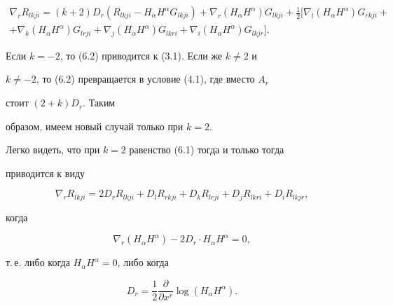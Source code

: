 \begin{multline}


\nabla_r R_{lkji}=(k+2)


D_r(R_{lkji}-H_\alpha H^\alpha G_{lkji})+


\nabla_r(H_\alpha H^\alpha)G_{lkji}+


\tfrac{1}{2}[


\nabla_l(H_\alpha H^\alpha)G_{rkji}+ \\


+ \nabla_k(H_\alpha H^\alpha)G_{lrji}+ 


\nabla_j(H_\alpha H^\alpha)G_{lkri}+


\nabla_i(H_\alpha H^\alpha)G_{lkjr}].


\tag{6.2}


\end{multline}





Если $k=-2$, то (6.2) приводится к (3.1). Если же $k\ne 2$ и


$k\ne -2$, то (6.2) превращается в условие (4.1), где вместо $A_r$


стоит $(2+k)D_r$. Таким


образом, имеем новый случай только при $k=2$.





Легко видеть, что при $k=2$ равенство (6.1) тогда и только тогда


приводится к виду


\begin{equation}


\nabla_r R_{lkji}=2D_r R_{lkji}+


D_l R_{rkji}+D_k R_{lrji}+D_j R_{lkri}+


D_i R_{lkjr},\tag{6.3}


\end{equation}


когда


$$


\nabla_r(H_\alpha H^\alpha)-2D_r\cdot H_\alpha H^\alpha=0,


$$


т.\,е. либо когда $H_\alpha H^\alpha=0$, либо когда


\begin{equation}


D_r=\frac{1}{2}\frac{\partial}{\partial x^r}\log(H_\alpha H^\alpha).


\tag{6.4}


\end{equation}


